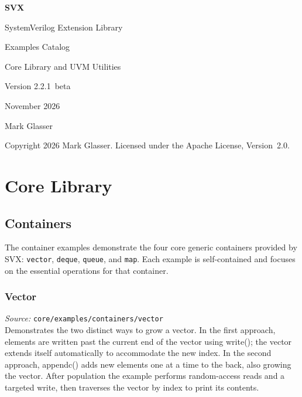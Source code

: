 \documentclass[11pt,letterpaper]{report}
\begin{document}
\begin{titlepage}
  \centering
  \vspace*{2cm}
  {\Huge\bfseries SVX\par}
  \vspace{0.5em}
  {\Large SystemVerilog Extension Library\par}
  \vspace{1.5em}
  {\huge Examples Catalog\par}
  \vspace{0.5em}
  {\large Core Library and UVM Utilities\par}
  \vspace{2em}
  {\large Version 2.2.1~beta\par}
  \vspace{0.5em}
  {\large November 2026\par}
  \vspace{0.5em}
  {\large Mark Glasser\par}
  \vfill
  {\small Copyright 2026 Mark Glasser.
  Licensed under the Apache License, Version~2.0.\par}
\end{titlepage}

\tableofcontents
\newpage
\part{Core Library}

\chapter{Containers}

The container examples demonstrate the four core generic containers provided by SVX\@: \texttt{vector}, \texttt{deque}, \texttt{queue}, and \texttt{map}.  Each example is self-contained and focuses on the essential operations for that container.

\section{Vector}

\textit{Source:} \texttt{core/examples/containers/vector}\\

Demonstrates the two distinct ways to grow a vector. In the first approach, elements are written past the current end of the vector using write(); the vector extends itself automatically to accommodate the new index. In the second approach, appendc() adds new elements one at a time to the back, also growing the vector. After population the example performs random-access reads and a targeted write, then traverses the vector by index to print its contents.
\end{document}
